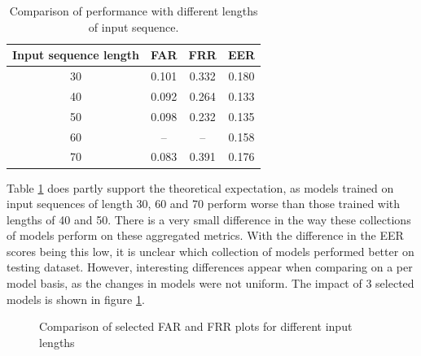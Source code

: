 \begin{center}
	\begin{table}[H]
		\begin{center}
			\begin{tabular}{ |c|c|c|c| } 
				\hline
				Input sequence length & FAR & FRR & EER \\
				\hline
				30 & 0.101 & 0.332 & 0.180 \\
				\hline
				40 & 0.092 & 0.264 & 0.133 \\
				\hline
				50 & 0.098 & 0.232 & 0.135 \\
				\hline
				60 & -- & -- & 0.158 \\
				\hline
				70 & 0.083 & 0.391 & 0.176 \\
				\hline
			\end{tabular}
		\end{center}
		\caption{Comparison of performance with different lengths of input sequence.}
		\label{table:len_vs_perf}
	\end{table}
\end{center}


Table \ref{table:len_vs_perf} does partly support the theoretical expectation, as models trained on input sequences of length 30, 60 and 70 perform worse than those trained with lengths of 40 and 50. There is a very small difference in the way these collections of models perform on these aggregated metrics. 
With the difference in the EER scores being this low, it is unclear which collection of models performed better on testing dataset.
However, interesting differences appear when comparing on a per model basis, as the changes in models were not uniform. The impact of 3 selected models is shown in figure \ref{fig:selected_frr_vs_far}. 

\begin{figure}[H]
	\centering

	\caption{Comparison of selected FAR and FRR plots for different input lengths}%
	\label{fig:selected_frr_vs_far}%
\end{figure}

